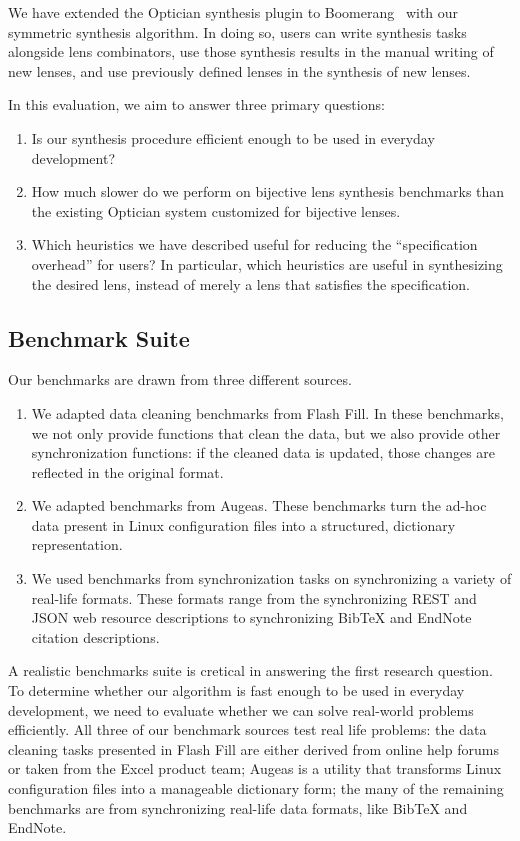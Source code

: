 \documentclass[acmsmall,screen,anonymous]{acmart}
\begin{document}
We have extended the Optician synthesis plugin to Boomerang~\cite{?} with our
symmetric synthesis algorithm. In doing so, users can write synthesis tasks
alongside lens combinators, use those synthesis results in the manual writing of
new lenses, and use previously defined lenses in the synthesis of new lenses.

In this evaluation, we aim to answer three primary questions:
\begin{enumerate}
\item Is our synthesis procedure efficient enough to be used in everyday
  development?

\item How much slower do we perform on bijective lens synthesis benchmarks than
  the existing Optician system customized for bijective lenses.
  
\item Which heuristics we have described useful for reducing the ``specification
  overhead'' for users? In particular, which heuristics are useful in
  synthesizing the desired lens, instead of merely a lens that satisfies the
  specification.
\end{enumerate}

\subsection{Benchmark Suite}
Our benchmarks are drawn from three different sources.
\begin{enumerate}
\item We adapted  data cleaning benchmarks from Flash Fill. In these
  benchmarks, we not only provide functions that clean the data, but we also
  provide other synchronization functions: if the cleaned data is updated, those
  changes are reflected in the original format.
\item We adapted  benchmarks from Augeas. These benchmarks turn the
  ad-hoc data present in Linux configuration files into a structured, dictionary
  representation.
\item We used  benchmarks from synchronization tasks on synchronizing a
  variety of real-life formats. These formats range from the synchronizing REST
  and JSON web resource descriptions to synchronizing BibTeX and EndNote
  citation descriptions.
\end{enumerate}

A realistic benchmarks suite is cretical in answering the first research
question. To determine whether our algorithm is fast enough to be used in
everyday development, we need to evaluate whether we can solve real-world
problems efficiently. All three of our benchmark sources test real life
problems: the data cleaning tasks presented in Flash Fill are either derived
from online help forums or taken from the Excel product team; Augeas is a
utility that transforms Linux configuration files into a manageable dictionary
form; the many of the remaining benchmarks are from synchronizing real-life data
formats, like BibTeX and EndNote.
\end{document}
